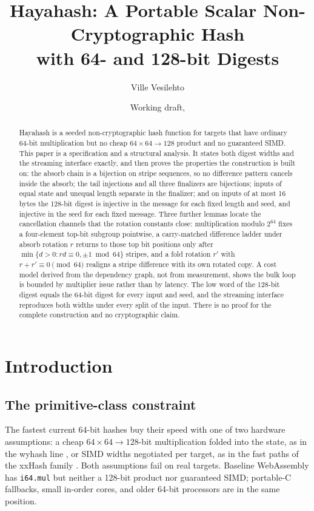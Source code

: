 \documentclass[10pt,a4paper]{article}
\title{Hayahash: A Portable Scalar Non-Cryptographic Hash\\
with 64- and 128-bit Digests}
\author{Ville Vesilehto}
\date{Working draft, \SnapshotDate}
\theoremstyle{remark}
\begin{document}
\maketitle

\begin{abstract}
Hayahash is a seeded non-cryptographic hash function for targets that have
ordinary 64-bit multiplication but no cheap \(64\times64\to128\) product and
no guaranteed SIMD.  This paper is a specification and a structural
analysis.  It states both digest widths and the streaming interface exactly,
and then proves the properties the construction is built on: the absorb
chain is a bijection on stripe sequences, so no difference pattern cancels
inside the absorb; the tail injections and all three finalizers are
bijections; inputs of equal state and unequal length separate in the
finalizer; and on inputs of at most 16 bytes the 128-bit digest is injective
in the message for each fixed length and seed, and injective in the seed for
each fixed message.  Three further lemmas locate the cancellation channels
that the rotation constants close: multiplication modulo \(2^{64}\) fixes a
four-element top-bit subgroup pointwise, a carry-matched difference ladder
under absorb rotation \(r\) returns to those top bit positions only after
\(\min\{d>0 : rd \equiv 0, \pm1 \bmod 64\}\) stripes, and a fold rotation
\(r'\) with \(r+r'\equiv 0 \pmod{64}\) realigns a stripe difference with its
own rotated copy.  A cost model derived from the dependency graph, not from
measurement, shows the bulk loop is bounded by multiplier issue rather than
by latency.  The low word of the 128-bit digest equals the 64-bit digest for
every input and seed, and the streaming interface reproduces both widths
under every split of the input.  There is no proof for the complete
construction and no cryptographic claim.
\end{abstract}

\section{Introduction}
\label{sec:intro}

\subsection{The primitive-class constraint}
\label{sec:motivation}

The fastest current 64-bit hashes buy their speed with one of two hardware
assumptions: a cheap \(64\times64\to128\)-bit multiplication folded into the
state, as in the wyhash line \cite{wang2021wyhash,nicoshev2025rapidhash}, or
SIMD widths negotiated per target, as in the fast paths of the xxHash family
\cite{collet2023xxhashspec}.  Both assumptions fail on real targets.
Baseline WebAssembly has \texttt{i64.mul} but neither a 128-bit product nor
guaranteed SIMD; portable-C fallbacks, small in-order cores, and older 64-bit
processors are in the same position.
\end{document}
